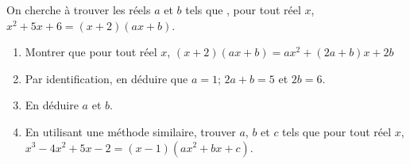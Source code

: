 
On cherche à trouver les réels $a$ et $b$ tels que , pour tout réel $x$, $x^2+5x+6=(x+2)(ax+b)$.

\begin{enumerate}
\item Montrer que pour tout réel $x$, $(x+2)(ax+b)=ax^2+(2a+b)x+2b$
\item Par identification, en déduire que $a=1$; $2a+b=5$ et $2b=6$.
\item En déduire $a$ et $b$.
\item En utilisant une méthode similaire, trouver $a$, $b$ et $c$ tels que pour tout réel $x$, $x^3-4x^2+5x-2=(x-1)(ax^2+bx+c)$.
\end{enumerate}

